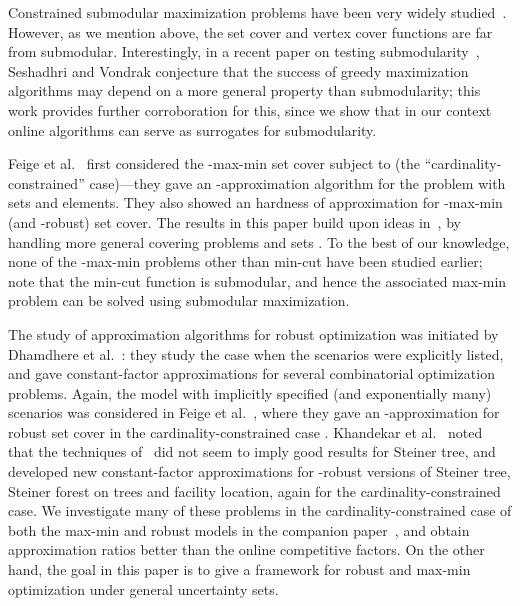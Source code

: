 \documentclass[11pt,letterpaper]{article}
\newcommand{\ignore}[1]{}
\newcounter{note}[section]
\begin{document}
Constrained submodular maximization problems have been very widely studied~\cite{NWF78I,NWF78II,S04,CCPV07,V08,KST09}.
However, as we mention above, the set cover and vertex cover functions are far from submodular. Interestingly, in a
recent paper on testing submodularity~\cite{SV10}, Seshadhri and Vondrak conjecture that the success of greedy
maximization algorithms may depend on a more general property than submodularity; this work provides further
corroboration for this, since we show that in our context online algorithms can serve as surrogates for submodularity.

Feige et al.~\cite{FJMM07} first considered the -max-min set cover subject to  (the
``cardinality-constrained'' case)---they gave an -approximation algorithm for the problem with  sets and  elements. They also
showed an  hardness of approximation for -max-min (and -robust) set cover. The
results in this paper build upon ideas in~\cite{FJMM07}, by handling more general covering problems and sets . To
the best of our knowledge, none of the -max-min problems other than min-cut have been studied earlier; note that the
min-cut function is submodular, and hence the associated max-min problem
can be solved using submodular maximization.

The study of approximation algorithms for robust optimization was initiated by Dhamdhere et al.~\cite{DGRS05,GGR06}:
they study the case when the scenarios were explicitly listed, and gave constant-factor approximations for several
combinatorial optimization problems. Again, the model with implicitly specified (and exponentially many) scenarios 
was considered in Feige et al.~\cite{FJMM07}, where they gave an -approximation for robust set cover
in the cardinality-constrained case . Khandekar et al.~\cite{KKMS08} noted that the techniques
of~\cite{FJMM07} did not seem to imply good results for Steiner tree, and developed new constant-factor approximations
for -robust versions of Steiner tree, Steiner forest on trees and facility location, again for the
cardinality-constrained case. We investigate many of these problems in the cardinality-constrained case of both the
max-min and robust models in the companion paper~\cite{GNR-k-rob}, and obtain approximation ratios better than the
online competitive factors. On the other hand, the goal in this paper is to give a framework for robust and max-min
optimization under general uncertainty sets.

\ignore{Considering the \emph{average} instead of the worst-case performance gives rise to the well-studied model of
stochastic optimization~\cite{RS04, IKMM04}.  Some common generalizations of the robust and stochastic models have been
considered (see, e.g., Swamy~\cite{Swamy08} and Agrawal et al.~\cite{ADSY09}).}
\end{document}
